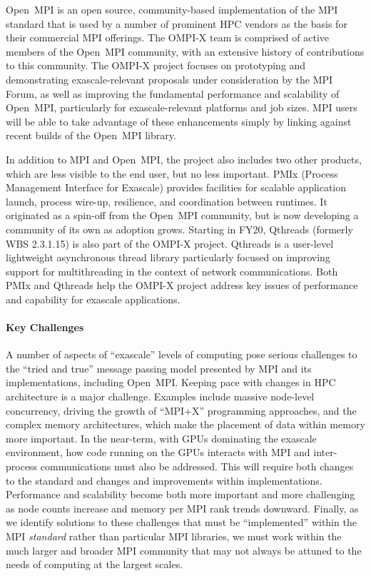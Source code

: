 Open~MPI is an open source, community-based implementation of the MPI
standard that is used by a number of prominent
HPC vendors as the basis for their commercial MPI offerings.   The
OMPI-X team is comprised of active members of the Open~MPI community,
with an extensive history of contributions to this community.
The OMPI-X project focuses on prototyping
and demonstrating exascale-relevant proposals under consideration by
the MPI Forum, as well as improving the fundamental performance and
scalability of Open~MPI, particularly for exascale-relevant platforms
and job sizes.
MPI users will be able to take advantage of these
enhancements simply by linking against recent builds of the Open~MPI
library.

In addition to MPI and Open~MPI, the project also includes two other products,
which are less visible to the end user, but no less important.
PMIx (Process Management Interface for Exascale) provides facilities for
scalable application launch, process wire-up, resilience, and coordination between runtimes.
It originated as a spin-off from the Open~MPI community, but is now developing a
community of its own as adoption grows.  Starting in FY20,
Qthreads (formerly WBS 2.3.1.15) is also part of the OMPI-X project.  Qthreads is a
user-level lightweight asynchronous thread library particularly focused on improving support for
multithreading in the context of network communications.  Both PMIx and Qthreads help the
OMPI-X project address key issues of performance and capability for exascale applications.


\paragraph{Key  Challenges}
A number of aspects of ``exascale'' levels
of computing pose serious challenges to the ``tried and true'' message
passing model presented by MPI and its implementations, including Open~MPI.
%
Keeping pace with changes in HPC architecture is a major challenge.
Examples include massive node-level concurrency, driving the
growth of ``MPI+X'' programming approaches,
and the complex memory architectures, which make the placement of data
within memory more important. In the near-term, with GPUs dominating the exascale
environment, how code running on the GPUs interacts with MPI and inter-process
communications must also be addressed.  This will require both changes to the standard
and changes and improvements within implementations.
%
Performance and scalability become both more important and more
challenging as node counts increase
and memory per MPI rank trends downward.
%
Finally, as we identify solutions to these challenges that must be
``implemented'' within the MPI \emph{standard} rather than particular MPI libraries,
we must work within the much larger and broader MPI
community that may not always be attuned to the needs of computing at the largest scales.

